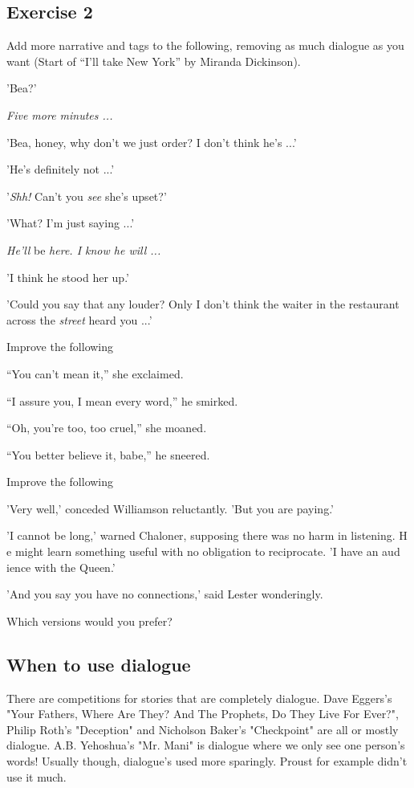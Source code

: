 \documentclass[11pt]{article}
\newenvironment{narrow}[2]{%
 \begin{list}{}{%
  \setlength{\topsep}{0pt}%
  \setlength{\leftmargin}{#1}%
  \setlength{\rightmargin}{#2}%
  \setlength{\listparindent}{\parindent}%
  \setlength{\itemindent}{\parindent}%
  \setlength{\parsep}{\parskip}%
 }%
\item[]}{\end{list}}
\begin{document}
\subsection*{Exercise 2}
Add more narrative and tags to the following, removing as much dialogue as
 you want (Start of ``I'll take New York'' by Miranda Dickinson).
\begin{narrow}{1.0cm}{1.0cm}
'Bea?'

\textit{Five more minutes ...}

'Bea, honey, why don't we just order? I don't think he's ...'

'He's definitely not ...'

'\textit{Shh!} Can't you \textit{see} she's upset?'

'What? I'm just saying ...'

\textit{He'll} be \textit{here. I know he will ...}

'I think he stood her up.'

'Could you say that any louder? Only I don't think the waiter in the restaurant 
across the \textit{street} heard you ...'
\end{narrow}

\noindent Improve the following
\begin{narrow}{1.0cm}{1.0cm}
``You can't mean it,'' she exclaimed.

``I assure you, I mean every word,'' he smirked.

``Oh, you're too, too cruel,'' she moaned.

``You better believe it, babe,'' he sneered.
\end{narrow}

\noindent Improve the following
\begin{narrow}{1.0cm}{1.0cm}
'Very well,' conceded Williamson reluctantly. 'But you are paying.'

'I cannot be long,' warned Chaloner, supposing there was no harm in listening. H
e might learn something useful with no obligation to reciprocate. 'I have an aud
ience with the Queen.'

'And you say you have no connections,' said Lester wonderingly.


\end{narrow}
 Which versions would you prefer?

\subsection*{When to use dialogue}
There are competitions for stories that are completely dialogue. Dave Eggers’s "Your Fathers, Where Are They? And The Prophets, Do They Live For Ever?", Philip Roth's "Deception" and Nicholson Baker's "Checkpoint" are all or mostly dialogue. A.B. Yehoshua's "Mr. Mani" is dialogue where we only see one person's words! Usually though, dialogue's used more sparingly. Proust for example didn't use it much.
\end{document}
